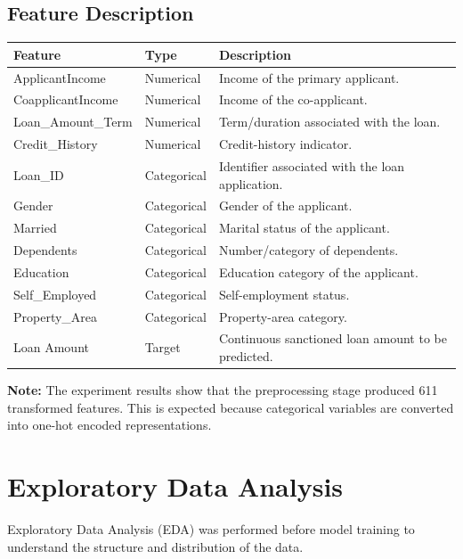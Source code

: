 \documentclass[12pt,a4paper]{article}
\begin{document}
\subsection{Feature Description}

\begin{longtable}{|p{4.5cm}|p{4cm}|p{5.5cm}|}
\hline
\textbf{Feature} & \textbf{Type} & \textbf{Description} \\ \hline
ApplicantIncome & Numerical & Income of the primary applicant. \\ \hline
CoapplicantIncome & Numerical & Income of the co-applicant. \\ \hline
Loan\_Amount\_Term & Numerical & Term/duration associated with the loan. \\ \hline
Credit\_History & Numerical & Credit-history indicator. \\ \hline
Loan\_ID & Categorical & Identifier associated with the loan application. \\ \hline
Gender & Categorical & Gender of the applicant. \\ \hline
Married & Categorical & Marital status of the applicant. \\ \hline
Dependents & Categorical & Number/category of dependents. \\ \hline
Education & Categorical & Education category of the applicant. \\ \hline
Self\_Employed & Categorical & Self-employment status. \\ \hline
Property\_Area & Categorical & Property-area category. \\ \hline
Loan Amount & Target & Continuous sanctioned loan amount to be predicted. \\ \hline
\end{longtable}

\textbf{Note:} The experiment results show that the preprocessing stage produced 611 transformed features. This is expected because categorical variables are converted into one-hot encoded representations.

\section{Exploratory Data Analysis}

Exploratory Data Analysis (EDA) was performed before model training to understand the structure and distribution of the data.
\end{document}
